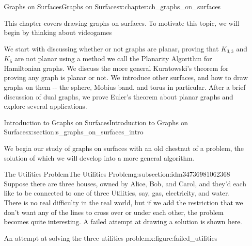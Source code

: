 \documentclass[oneside,10pt,]{book}
\numberwithin{equation}{section}
\begin{document}
%
%
\typeout{************************************************}
\typeout{************************************************}
%
\begin{chapterptx}{Graphs on Surfaces}{}{Graphs on Surfaces}{}{}{x:chapter:ch_graphs_on_surfaces}
\begin{introduction}{}%
This chapter covers drawing graphs on surfaces. To motivate this topic, we will begin by thinking about videogames%
\par
We start with discussing whether or not graphs are planar, proving that \(K_{3,3}\) and \(K_5\) are not planar using a method we call the Planarity Algorithm for Hamiltonian graphs.  We discuss the more general Kuratowski's theorem for proving any graph is planar or not.  We introduce other surfaces, and how to draw graphs on them -{}-{} the sphere, Mobius band, and torus in particular.  After a brief discussion of dual graphs, we prove Euler's theorem about planar graphs and explore several applications.%
\end{introduction}%
%
%
\typeout{************************************************}
\typeout{************************************************}
%
\begin{sectionptx}{Introduction to Graphs on Surfaces}{}{Introduction to Graphs on Surfaces}{}{}{x:section:s_graphs_on_surfaces_intro}
\begin{introduction}{}%
We begin our study of graphs on surfaces with an old chestnut of a problem, the solution of which we will develop into a more general algorithm.%
\end{introduction}%
%
%
\typeout{************************************************}
\typeout{************************************************}
%
\begin{subsectionptx}{The Utilities Problem}{}{The Utilities Problem}{}{}{g:subsection:idm34736981062368}
Suppose there are three houses, owned by Alice, Bob, and Carol, and they'd each like to be connected to one of three Utilities, say, gas, electricity, and water.  There is no real difficulty in the real world, but if we add the restriction that we don't want any of the lines to cross over or under each other, the problem becomes quite interesting.  A failed attempt at drawing a solution is shown here.%
\begin{figureptx}{An attempt at solving the three utilities problem}{x:figure:failed_utilities}{}%
\begin{image}{0.15}{0.7}{0.15}%

\end{image}
\end{figureptx}
\end{subsectionptx}
\end{sectionptx}
\end{chapterptx}
\end{document}
